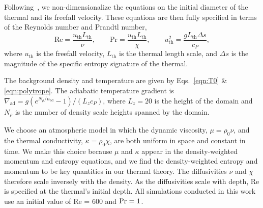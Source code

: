 Following \LJ\,, we non-dimensionalize the equations on the initial diameter of the thermal and its freefall velocity.
These equations are then fully specified in terms of the Reynolds number and Prandtl number,
\begin{equation}
\text{Re} = \frac{ u_{\text{th}} L_{\text{th}}}{\nu}, \qquad
\text{Pr} = \frac{ u_{\text{th}} L_{\text{th}}}{\chi}, \qquad
u_{\text{th}}^2 = \frac{g L_{\text{th}} \Delta s}{c_P},
\end{equation}
where $u_{\text{th}}$ is the freefall velocity, $L_{\text{th}}$ is the thermal length scale, and
$\Delta s$ is the magnitude of the specific entropy signature of the thermal.

The background density and temperature are given by Eqs.~\ref{eqn:T0} \& \ref{eqn:polytrope}.
The adiabatic temperature gradient is $\nabla_{\text{ad}}=g(e^{N_\rho/n_{\text{ad}}}-1)/(L_z c_P)$, where $L_z=20$ is the height of the domain and $N_\rho$ is the number of density scale heights spanned by the domain.

We choose an atmospheric model in which the dynamic viscosity, $\mu = \rho_0 \nu$, and the thermal conductivity, $\kappa = \rho_0 \chi$, are both uniform in space and constant in time.
We make this choice because $\mu$ and $\kappa$ appear in the density-weighted momentum and entropy equations, and we find the density-weighted entropy and momentum to be key quantities in our thermal theory.
The diffusivities $\nu$ and $\chi$ therefore scale inversely with the density.
As the diffusivities scale with depth, Re is specified at the thermal's initial depth.
All simulations conducted in this work use an initial value of Re = 600 and $\mbox{\text{Pr} = 1}$.

